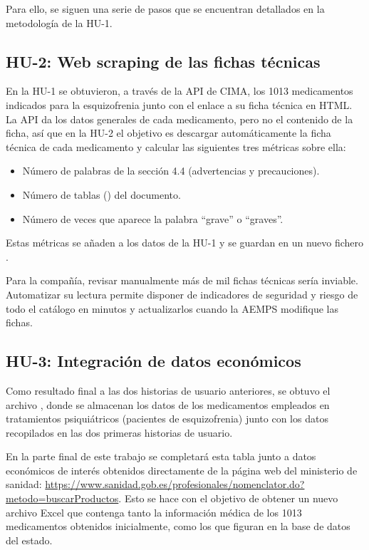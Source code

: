\documentclass[11pt,a4paper]{article}
\begin{document}
Para ello, se siguen una serie de pasos que se encuentran detallados en la metodología de la
HU-1.

\subsection{HU-2: Web scraping de las fichas técnicas}
En la HU-1 se obtuvieron, a través de la API de CIMA, los 1013 medicamentos indicados para la
esquizofrenia junto con el enlace a su ficha técnica en HTML. La API da los datos generales
de cada medicamento, pero no el contenido de la ficha, así que en la HU-2 el objetivo es
descargar automáticamente la ficha técnica de cada medicamento y calcular las siguientes tres métricas sobre
ella:
\begin{itemize}
  \item Número de palabras de la sección 4.4 (advertencias y precauciones).
  \item Número de tablas () del documento.
  \item Número de veces que aparece la palabra ``grave'' o ``graves''.
\end{itemize}
Estas métricas se añaden a los datos de la HU-1 y se guardan en un nuevo fichero .

Para la compañía, revisar manualmente más de mil fichas técnicas sería inviable. Automatizar
su lectura permite disponer de indicadores de seguridad y riesgo de todo el catálogo en minutos
y actualizarlos cuando la AEMPS modifique las fichas.

\subsection{HU-3: Integración de datos económicos}
Como resultado final a las dos historias de usuario anteriores, se obtuvo el archivo , donde se almacenan los datos de los medicamentos empleados en
tratamientos psiquiátricos (pacientes de esquizofrenia) junto con los datos recopilados en las
dos primeras historias de usuario.

En la parte final de este trabajo se completará esta tabla junto a datos económicos de interés
obtenidos directamente de la página web del ministerio de sanidad:
\url{https://www.sanidad.gob.es/profesionales/nomenclator.do?metodo=buscarProductos}.
Esto se hace con el objetivo de obtener un nuevo archivo Excel que contenga tanto la información
médica de los 1013 medicamentos obtenidos inicialmente, como los que figuran en la base de
datos del estado.
\end{document}
